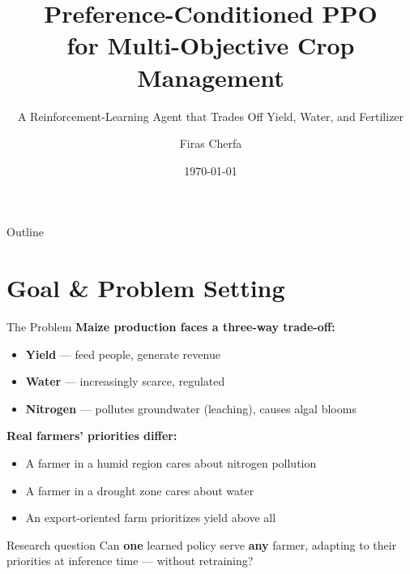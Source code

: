 \documentclass[10pt,aspectratio=169]{beamer}
\title{Preference-Conditioned PPO\\for Multi-Objective Crop Management}
\subtitle{A Reinforcement-Learning Agent that Trades Off Yield, Water, and Fertilizer}
\author{Firas Cherfa}
\institute{Master's Thesis --- Smart Farming Track}
\date{\today}
\newcommand{\strong}[1]{\textbf{\textcolor{cAccent}{#1}}}
\begin{document}
\begin{frame}[plain]
  \titlepage
\end{frame}

\begin{frame}{Outline}
  \tableofcontents[hideallsubsections]
\end{frame}

\section{Goal \& Problem Setting}

\begin{frame}{The Problem}
  \textbf{Maize production faces a three-way trade-off:}
  \begin{itemize}
    \item \textcolor{cYield}{\textbf{Yield}} — feed people, generate revenue
    \item \textcolor{cWater}{\textbf{Water}} — increasingly scarce, regulated
    \item \textcolor{cFert}{\textbf{Nitrogen}} — pollutes groundwater (leaching), causes algal blooms
  \end{itemize}

  \vspace{1em}
  \textbf{Real farmers' priorities differ:}
  \begin{itemize}
    \item A farmer in a humid region cares about nitrogen pollution
    \item A farmer in a drought zone cares about water
    \item An export-oriented farm prioritizes yield above all
  \end{itemize}

  \vspace{1em}
  \begin{block}{Research question}
  Can \strong{one} learned policy serve \strong{any} farmer, adapting to their priorities at inference time --- without retraining?
  \end{block}
\end{frame}
\end{document}
